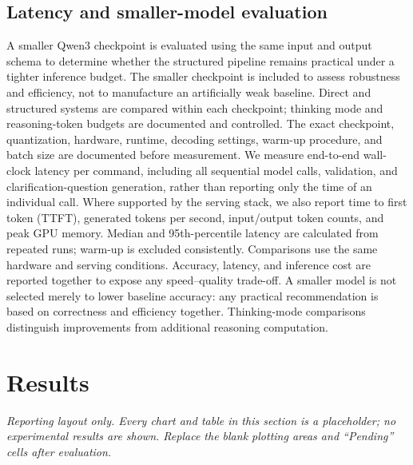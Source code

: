 \documentclass[10pt,conference]{IEEEtran}
\begin{document}
\subsection{Latency and smaller-model evaluation}
A smaller Qwen3 checkpoint is evaluated using the same input and output schema to determine whether the structured pipeline remains practical under a tighter inference budget. The smaller checkpoint is included to assess robustness and efficiency, not to manufacture an artificially weak baseline. Direct and structured systems are compared within each checkpoint; thinking mode and reasoning-token budgets are documented and controlled. The exact checkpoint, quantization, hardware, runtime, decoding settings, warm-up procedure, and batch size are documented before measurement. We measure end-to-end wall-clock latency per command, including all sequential model calls, validation, and clarification-question generation, rather than reporting only the time of an individual call. Where supported by the serving stack, we also report time to first token (TTFT), generated tokens per second, input/output token counts, and peak GPU memory. Median and 95th-percentile latency are calculated from repeated runs; warm-up is excluded consistently. Comparisons use the same hardware and serving conditions. Accuracy, latency, and inference cost are reported together to expose any speed--quality trade-off. A smaller model is not selected merely to lower baseline accuracy: any practical recommendation is based on correctness and efficiency together. Thinking-mode comparisons distinguish improvements from additional reasoning computation.

\FloatBarrier
\section{Results}
\noindent\textit{Reporting layout only. Every chart and table in this section is a placeholder; no experimental results are shown. Replace the blank plotting areas and ``Pending'' cells after evaluation.}
\end{document}
